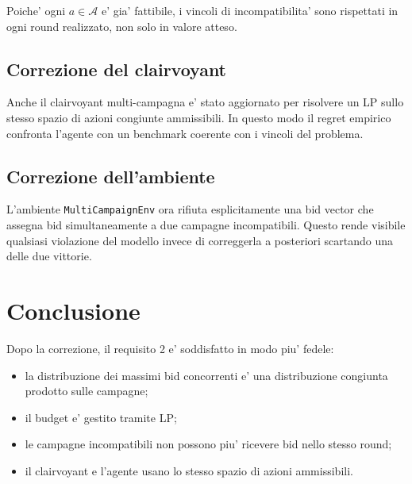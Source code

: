 \documentclass[11pt,a4paper]{article}
\begin{document}
Poiche' ogni \(a \in \mathcal{A}\) e' gia' fattibile, i vincoli di
incompatibilita' sono rispettati in ogni round realizzato, non solo in valore
atteso.

\subsection{Correzione del clairvoyant}

Anche il clairvoyant multi-campagna e' stato aggiornato per risolvere un LP
sullo stesso spazio di azioni congiunte ammissibili. In questo modo il regret
empirico confronta l'agente con un benchmark coerente con i vincoli del
problema.

\subsection{Correzione dell'ambiente}

L'ambiente \texttt{MultiCampaignEnv} ora rifiuta esplicitamente una bid vector
che assegna bid simultaneamente a due campagne incompatibili. Questo rende
visibile qualsiasi violazione del modello invece di correggerla a posteriori
scartando una delle due vittorie.

\section{Conclusione}

Dopo la correzione, il requisito 2 e' soddisfatto in modo piu' fedele:
\begin{itemize}
  \item la distribuzione dei massimi bid concorrenti e' una distribuzione
  congiunta prodotto sulle campagne;
  \item il budget e' gestito tramite LP;
  \item le campagne incompatibili non possono piu' ricevere bid nello stesso
  round;
  \item il clairvoyant e l'agente usano lo stesso spazio di azioni ammissibili.
\end{itemize}
\end{document}
